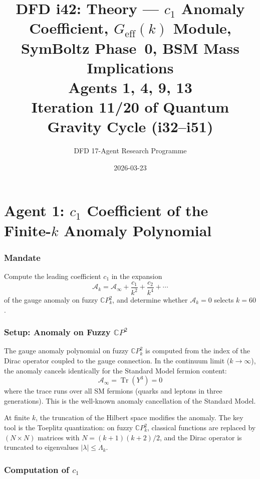 \documentclass[11pt,a4paper]{article}
\title{DFD i42: Theory --- $c_1$ Anomaly Coefficient, $G_{\mathrm{eff}}(k)$ Module,\\SymBoltz Phase~0, BSM Mass Implications\\[6pt]
\large Agents 1, 4, 9, 13\\[6pt]
\normalsize Iteration 11/20 of Quantum Gravity Cycle (i32--i51)}
\author{DFD 17-Agent Research Programme}
\date{2026-03-23}
\newcommand{\Tr}{\operatorname{Tr}}
\newcommand{\CP}{\mathbb{C}P}
\begin{document}
\maketitle
\tableofcontents
\newpage

\part{Agent 1: $c_1$ Coefficient of the Finite-$k$ Anomaly Polynomial}
\label{part:agent1}

\section{Mandate}

Compute the leading coefficient $c_1$ in the expansion
\begin{equation}
\mathcal{A}_k = \mathcal{A}_\infty + \frac{c_1}{k^2} + \frac{c_2}{k^4} + \cdots
\end{equation}
of the gauge anomaly on fuzzy $\CP^2_k$, and determine whether $\mathcal{A}_k = 0$ selects $k = 60$.

\section{Setup: Anomaly on Fuzzy $\CP^2$}

The gauge anomaly polynomial on fuzzy $\CP^2_k$ is computed from the index of the Dirac operator coupled to the gauge connection. In the continuum limit ($k \to \infty$), the anomaly cancels identically for the Standard Model fermion content:
\begin{equation}
\mathcal{A}_\infty = \Tr(Y^3) = 0
\end{equation}
where the trace runs over all SM fermions (quarks and leptons in three generations). This is the well-known anomaly cancellation of the Standard Model.

At finite $k$, the truncation of the Hilbert space modifies the anomaly. The key tool is the Toeplitz quantization: on fuzzy $\CP^2_k$, classical functions are replaced by $(N \times N)$ matrices with $N = (k+1)(k+2)/2$, and the Dirac operator is truncated to eigenvalues $|\lambda| \leq \Lambda_k$.

\section{Computation of $c_1$}
\end{document}

